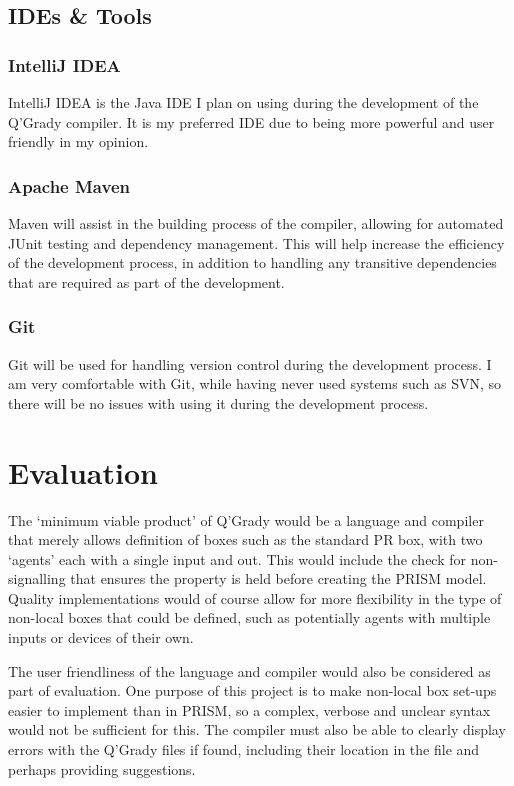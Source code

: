 \documentclass[11pt, a4paper]{article}
\begin{document}
\subsection{IDEs \& Tools} %
\label{sub:ides_tools}
\subsubsection{IntelliJ IDEA} %
IntelliJ IDEA is the Java IDE I plan on using during the development of the
Q'Grady compiler. It is my preferred IDE due to being more powerful and user
friendly in my opinion.
\label{ssub:intellij_idea}
\subsubsection{Apache Maven} %
\label{ssub:apache_maven}
Maven will assist in the building process of the compiler, allowing for 
automated JUnit testing and dependency management. This will help increase the
efficiency of the development process, in addition to handling any transitive
dependencies that are required as part of the development.
\subsubsection{Git} %
\label{ssub:git}
Git will be used for handling version control during the development process. I
am very comfortable with Git, while having never used systems such as SVN, so
there will be no issues with using it during the development process.


\section{Evaluation} %
\label{sec:evaluation}
The `minimum viable product' of Q'Grady would be a language and compiler
that merely allows definition of boxes such as the standard PR box, with two
`agents' each with a single input and out. This would include the check for
non-signalling that ensures the property is held before creating the PRISM
model. Quality implementations would of course allow for more flexibility in the
type of non-local boxes that could be defined, such as potentially agents with
multiple inputs or devices of their own.

The user friendliness of the language and compiler would also be considered as
part of evaluation. One purpose of this project is to make non-local box set-ups
easier to implement than in PRISM, so a complex, verbose and unclear syntax
would not be sufficient for this. The compiler must also be able to clearly
display errors with the Q'Grady files if found, including their location in the
file and perhaps providing suggestions.
\end{document}

